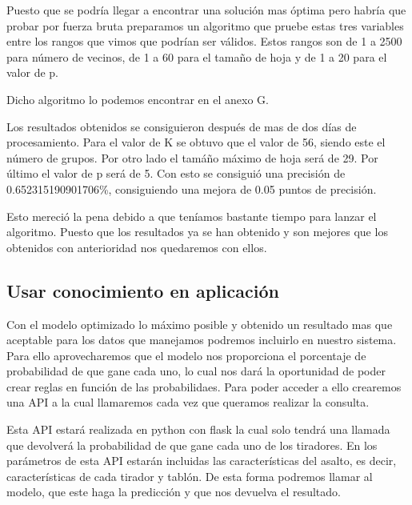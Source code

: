 Puesto que se podría llegar a encontrar una solución mas óptima pero habría que probar
por fuerza bruta preparamos un algoritmo que pruebe estas tres variables entre los rangos
que vimos que podrían ser válidos. Estos rangos son de 1 a 2500 para número de vecinos,
de 1 a 60 para el tamaño de hoja y de 1 a 20 para el valor de p.

Dicho algoritmo lo podemos encontrar en el anexo G.

Los resultados obtenidos se consiguieron después de mas de dos días de procesamiento.
Para el valor de K se obtuvo que el valor de 56, siendo este el número de grupos. Por otro lado
el tamáño máximo de hoja será de 29. Por último el valor de p será de 5. Con esto se consiguió
una precisión de 0.652315190901706\%, consiguiendo una mejora de 0.05 puntos de precisión.

Esto mereció la pena debido a que teníamos bastante tiempo para lanzar el algoritmo. Puesto que
los resultados ya se han obtenido y son mejores que los obtenidos con anterioridad nos
quedaremos con ellos.

\subsection{Usar conocimiento en aplicación}

Con el modelo optimizado lo máximo posible y obtenido un resultado mas que aceptable
para los datos que manejamos podremos incluirlo en nuestro sistema. Para ello aprovecharemos
que el modelo nos proporciona el porcentaje de probabilidad de que gane cada uno, lo cual nos
dará la oportunidad de poder crear reglas en función de las probabilidaes. Para poder acceder
a ello crearemos una API a la cual llamaremos cada vez que queramos realizar la consulta.

Esta API estará realizada en python con flask la cual solo tendrá una llamada que devolverá
la probabilidad de que gane cada uno de los tiradores. En los parámetros de esta API estarán
incluidas las características del asalto, es decir, características de cada tirador y tablón.
De esta forma podremos llamar al modelo, que este haga la predicción y que nos
devuelva el resultado.

